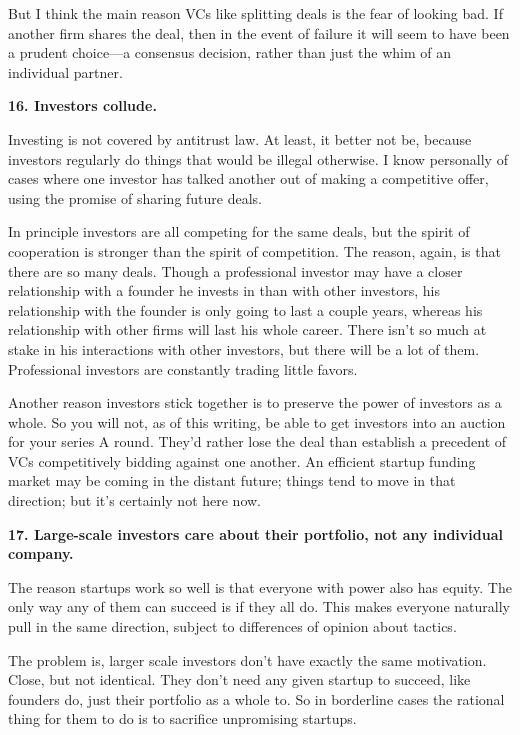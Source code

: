 But I think the main reason VCs like splitting deals is the fear of
looking bad. If another firm shares the deal, then in the event of
failure it will seem to have been a prudent choice---a consensus
decision, rather than just the whim of an individual partner.

\textbf{16. Investors collude.}

Investing is not covered by antitrust law. At least, it better not be,
because investors regularly do things that would be illegal otherwise. I
know personally of cases where one investor has talked another out of
making a competitive offer, using the promise of sharing future deals.

In principle investors are all competing for the same deals, but the
spirit of cooperation is stronger than the spirit of competition. The
reason, again, is that there are so many deals. Though a professional
investor may have a closer relationship with a founder he invests in
than with other investors, his relationship with the founder is only
going to last a couple years, whereas his relationship with other firms
will last his whole career. There isn't so much at stake in his
interactions with other investors, but there will be a lot of them.
Professional investors are constantly trading little favors.

Another reason investors stick together is to preserve the power of
investors as a whole. So you will not, as of this writing, be able to
get investors into an auction for your series A round. They'd rather
lose the deal than establish a precedent of VCs competitively bidding
against one another. An efficient startup funding market may be coming
in the distant future; things tend to move in that direction; but it's
certainly not here now.

\textbf{17. Large-scale investors care about their portfolio, not any
individual company.}

The reason startups work so well is that everyone with power also has
equity. The only way any of them can succeed is if they all do. This
makes everyone naturally pull in the same direction, subject to
differences of opinion about tactics.

The problem is, larger scale investors don't have exactly the same
motivation. Close, but not identical. They don't need any given startup
to succeed, like founders do, just their portfolio as a whole to. So in
borderline cases the rational thing for them to do is to sacrifice
unpromising startups.


